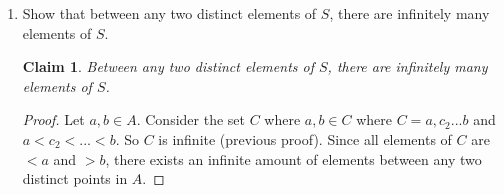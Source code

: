 \documentclass[11pt]{letter}
\newtheorem{claim}{Claim}
\theoremstyle{definition}
\begin{document}
\begin{description}
\begin{enumerate}
\begin{enumerate}
                          
                            
                          
                        \item Show that between any two distinct elements of $S$, there are infinitely many elements of $S$.
                          \begin{claim}
                            Between any two distinct elements of $S$, there are infinitely many elements of $S$.
                          \end{claim}
                          \begin{proof}
                            Let $a,b\in A$. Consider the set $C$ where $a,b\in C$ where $C=a,c_2...b$ and $a<c_2<...<b$. So $C$ is infinite (previous proof). Since all elements of $C$ are $<a$ and $>b$, there exists an infinite amount of elements between any two distinct points in $A$.
                            \end{proof}
                          
                          
			\end{enumerate}
	
	\end{enumerate}		
		
	\end{description}
\end{document}
